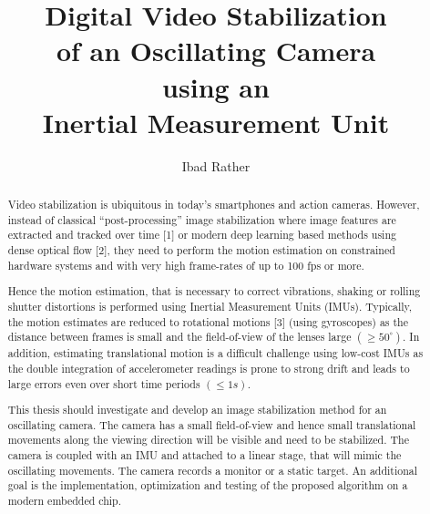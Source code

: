 \documentclass[
thesis  %
]{csthes}
\title{Digital Video Stabilization \\ of an Oscillating Camera \\
using an \\ Inertial Measurement Unit}
\subtitle{}%
\author{Ibad Rather \matr{1532894}}
\begin{document}
\maketitle
\begin{abstract}
Video stabilization is ubiquitous in today's smartphones and action cameras. However, instead of classical “post-processing” image stabilization where image features are extracted and tracked over time [1] or modern deep learning based methods using dense optical flow [2], they need to perform the motion estimation on constrained hardware systems and with very high  frame-rates of up to 100 fps or more. 

Hence the motion estimation, that is necessary to correct vibrations, shaking or rolling shutter distortions is performed using Inertial Measurement Units (IMUs). Typically, the motion estimates are reduced to rotational motions [3] (using gyroscopes) as the distance between frames is small and the field-of-view of the lenses large $(\geq 50^\circ)$. In addition, estimating translational motion is a difficult challenge using low-cost IMUs as the double integration of accelerometer readings is prone to strong drift and leads to large errors even over short time periods $(\leq 1s)$. 

This thesis should investigate and develop an image stabilization method for an oscillating camera. The camera has a small field-of-view and hence small translational movements along the viewing direction will be visible and need to be stabilized. The camera is coupled with an IMU and attached to a linear stage, that will mimic the oscillating movements. The camera records a monitor or a static target. An additional goal is the implementation, optimization and testing of the proposed algorithm on a modern embedded chip.

\end{abstract}
\tableofcontents%

\listoftables%
\listoffigures%

\mainmatter







\end{document}
